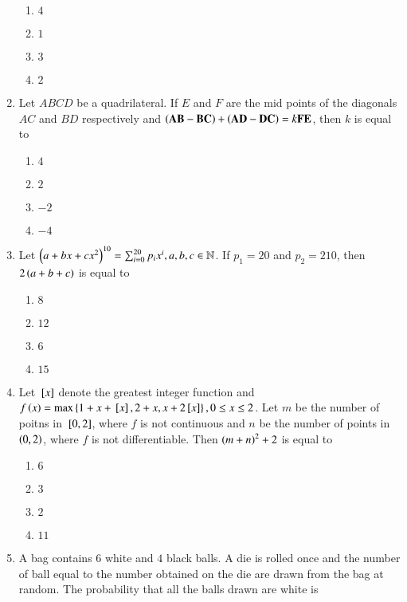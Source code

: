 \documentclass[journal,onecolumn]{IEEEtran}
\theoremstyle{remark}
\begin{document}
\begin{enumerate}
	\begin{enumerate}
		\item $4$ 
		\item $1$
		\item $3$
		\item $2$
	\end{enumerate}

    \item Let $ABCD$ be a quadrilateral. If $E$ and $F$ are the mid points of the diagonals $AC$ and $BD$ respectively and $\left(\mathbf{AB} - \mathbf{BC}\right) + \left(\mathbf{AD} - \mathbf{DC}\right) = k\mathbf{FE}$, then $k$ is equal to 

	\begin{enumerate}
		\item $4$
		\item $2$
		\item $-2$
		\item $-4$
	\end{enumerate}

    \item Let $\left(a + bx + cx^2\right)^{10} = \sum_{i = 0}^{20} p_{i} x^{i}, a, b, c \in \mathbb{N}$. If $p_1 = 20$ and $p_2 = 210$, then $2\left(a + b + c\right)$ is equal to

	\begin{enumerate}
		\item $8$
		\item $12$
		\item $6$
		\item $15$
	\end{enumerate}

    \item Let ${}\left[x\right]$ denote the greatest integer function and $f\left(x\right) = \max\left\{1 + x + {}\left[x\right], 2 + x, x + 2{}\left[x\right]\right\}, 0 \leq x \leq 2$. Let $m$ be the number of poitns in ${}\left[0, 2\right]$, where $f$ is not continuous and $n$ be the number of points in $\left(0, 2\right)$, where $f$ is not differentiable. Then $\left(m + n\right)^2 + 2$ is equal to

	\begin{enumerate}
		\item $6$ 
		\item $3$ 
		\item $2$ 
		\item $11$ 
	\end{enumerate}

    \item A bag contains $6$ white and $4$ black balls. A die is rolled once and the number of ball equal to the number obtained on the die are drawn from the bag at random. The probability that all the balls drawn are white is


\end{enumerate}
\end{document}
